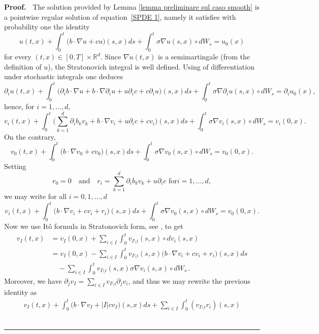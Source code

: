\documentclass[a4paper,10pt]{article}
\newenvironment{proof}[1][Proof]{\noindent\textbf{#1.} }{\ \rule{0.5em}{0.5em}}
\begin{document}
\begin{proof}
\textbf{\ }The solution provided by Lemma
\ref{lemma preliminare sul caso smooth} is a pointwise regular solution of
equation~\eqref{SPDE 1}, namely it satisfies with probability one the
identity
\[
u(t,x)  +\int_{0}^{t} \big(b\cdot\nabla u+cu\big)  (
s,x)  ds+\int_{0}^{t}\sigma\nabla u(s,x)  \circ
dW_{s}=u_{0}(x)
\]
for every $(t,x) \in [0,T]  \times\mathbb{R}^{d}$.
Since $\nabla u(t,x)$ is a semimartingale (from the definition
of $u$), the Stratonovich integral is well defined. Using \cite[Theorem 7.10]{KUNITA84} of
differentiation under stochastic integrals one deduces
\[
\partial_{i}u(t,x)  +\int_{0}^{t} \big(\partial_{i}b\cdot\nabla
u+b\cdot\nabla\partial_{i}u+u\partial_{i}c+c\partial_{i}u \big)  (
s,x)  ds+\int_{0}^{t}\sigma\nabla\partial_{i}u(s,x)  \circ
dW_{s}=\partial_{i}u_{0}(x),
\]
hence, for $i=1,\ldots,d$, 
\[
v_{i}(t,x)  +\int_{0}^{t}\Big(\sum_{k=1}^{d}\partial_{i}
b_{k}v_{k}+b\cdot\nabla v_{i}+u\partial_{i}c+cv_{i}\Big)  (
s,x)  ds+\int_{0}^{t}\sigma\nabla v_{i}(s,x)  \circ
dW_{s}=v_{i}(0,x)  .
\]
On the contrary,
\[
v_{0}(t,x)  +\int_{0}^{t} \big(b\cdot\nabla v_{0}
+cv_{0}\big)  (s,x)  ds+\int_{0}^{t}\sigma\nabla v_{0}(
s,x)  \circ dW_{s}=v_{0}(0,x)  .
\]
Setting
\begin{equation*}
r_{0} =0 \quad \text{and} \quad r_{i} =\sum_{k=1}^{d}\partial_{i}b_{k}v_{k}+u\partial_{i}c\text{ \ for
}i=1,\ldots,d ,
\end{equation*}
we may write for all $i=0,1,\ldots,d$
\[
v_{i}(t,x)  +\int_{0}^{t} \big(b\cdot\nabla v_{i}+cv_{i}
+r_{i}\big)  (s,x)  ds+\int_{0}^{t}\sigma\nabla v_{0}(
s,x)  \circ dW_{s}=v_{0}(0,x).
\]
Now we use It\^{o} formula in Stratonovich form, see \cite[Theorem 8.3]{KUNITA84},
to get
\begin{align*}
v_{I}(t,x)   &  =v_{I}(0,x)  +\sum_{i\in I}\int 
_{0}^{t}v_{I\setminus i}(s,x)  \circ dv_{i}(s,x) \\
&  =v_{I}(0,x)  -\sum_{i\in I}\int_{0}^{t}v_{I\setminus i}(
s,x)  \big(b\cdot\nabla v_{i}+cv_{i}+r_{i}\big)  (
s,x)  ds\\
& \quad {} -\sum_{i\in I}\int_{0}^{t}v_{I\setminus i}(s,x)  \sigma\nabla
v_{i}(s,x)  \circ dW_{s} \, .
\end{align*}
Moreover, we have $\partial_{j}v_{I}=\sum_{i\in I}v_{I\setminus i}\partial_{j}v_{i}$,
and thus we may rewrite the previous identity as
\begin{multline}
 v_{I}(t,x)  +\int_{0}^{t} \big(b\cdot\nabla v_{I}+\left\vert
I\right\vert cv_{I}\big)  (s,x)  ds+\sum_{i\in I}\int_{0} 
^{t}(v_{I\setminus i}r_{i})  (s,x)

\end{multline}
\end{proof}
\end{document}

